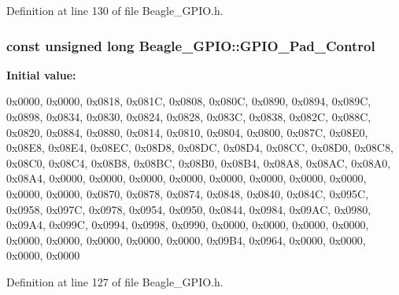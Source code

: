 \-Definition at line 130 of file \-Beagle\-\_\-\-G\-P\-I\-O.\-h.

\hypertarget{class_beagle___g_p_i_o_ae4a0a2a56a0ba31145a5f41eb3439886}{
\subsubsection[{\-G\-P\-I\-O\-\_\-\-Pad\-\_\-\-Control}]{\setlength{\rightskip}{0pt plus 5cm}const unsigned long {\bf \-Beagle\-\_\-\-G\-P\-I\-O\-::\-G\-P\-I\-O\-\_\-\-Pad\-\_\-\-Control}}}\label{class_beagle___g_p_i_o_ae4a0a2a56a0ba31145a5f41eb3439886}
{\bfseries \-Initial value\-:}
\begin{DoxyCode}

{
        0x0000, 0x0000, 0x0818, 0x081C, 0x0808, 
        0x080C, 0x0890, 0x0894, 0x089C, 0x0898, 
        0x0834, 0x0830, 0x0824, 0x0828, 0x083C, 
        0x0838, 0x082C, 0x088C, 0x0820, 0x0884, 
        0x0880, 0x0814, 0x0810, 0x0804, 0x0800, 
        0x087C, 0x08E0, 0x08E8, 0x08E4, 0x08EC, 
        0x08D8, 0x08DC, 0x08D4, 0x08CC, 0x08D0, 
        0x08C8, 0x08C0, 0x08C4, 0x08B8, 0x08BC, 
        0x08B0, 0x08B4, 0x08A8, 0x08AC, 0x08A0, 
        0x08A4,                                 
        0x0000, 0x0000, 0x0000, 0x0000, 0x0000, 
        0x0000, 0x0000, 0x0000, 0x0000, 0x0000, 
        0x0870, 0x0878, 0x0874, 0x0848, 0x0840, 
        0x084C, 0x095C, 0x0958, 0x097C, 0x0978, 
        0x0954, 0x0950, 0x0844, 0x0984, 0x09AC, 
        0x0980, 0x09A4, 0x099C, 0x0994, 0x0998, 
        0x0990, 0x0000, 0x0000, 0x0000, 0x0000, 
        0x0000, 0x0000, 0x0000, 0x0000, 0x0000, 
        0x09B4, 0x0964, 0x0000, 0x0000, 0x0000, 
        0x0000                                  
}
\end{DoxyCode}


\-Definition at line 127 of file \-Beagle\-\_\-\-G\-P\-I\-O.\-h.

